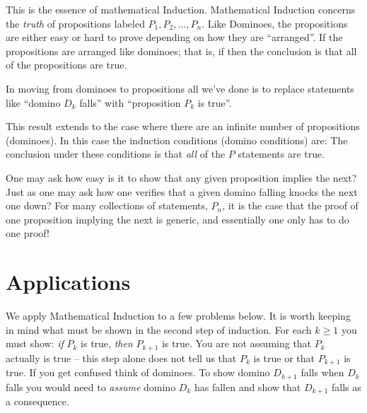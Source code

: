 This is the essence of mathematical Induction. Mathematical Induction concerns the 
{\it truth\/} of propositions labeled $P_1, P_2, \ldots, P_n$. 
Like Dominoes, the propositions are either easy or hard to prove depending 
on how they are ``arranged''.
If the propositions 
are arranged like dominoes; that is, if
\beginEnum
{}
\endEnum
then the conclusion is that all of the propositions are true. 

In moving 
from dominoes to propositions 
all we've done is to replace statements like 
``domino $D_k$ falls'' with ``proposition $P_k$ is true''.

This result extends to the case where there are an infinite number of 
propositions (dominoes).
In this case the induction conditions (domino conditions) are:
\beginEnum
{}
\endEnum
The conclusion under these conditions is that {\it all\/} of the $P$ 
statements are true.

One may ask how easy is it to show that any given proposition implies the next? Just as one may ask 
how one verifies that a given domino falling knocks the next one down?
For many collections of statements, $P_n$, it is the case that the proof of one proposition implying the next 
is generic, and essentially one only has to do one proof!

\section{Applications}
We apply Mathematical Induction to a few problems below. It is worth keeping 
in mind what must be shown in the second step of induction. 
For each $k \ge 1$ you must show: {\it if\/} $P_k$ is true,
{\it then\/} $P_{k+1}$ is true. You are not assuming that $P_k$ actually is
true -- this step alone does not tell us that $P_k$ is
true or that $P_{k+1}$ is true. If you get confused think of dominoes.
To show domino 
$D_{k+1}$ falls when $D_{k}$ falls you would need to {\it assume\/}  
domino $D_k$ has fallen and show that $D_{k+1}$ falls as a consequence.

